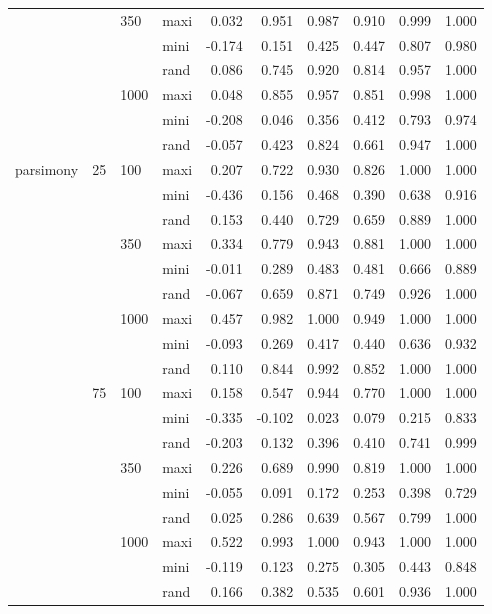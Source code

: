 \begin{longtable}{llllrrrrrr}
   &  & 350 & maxi & 0.032 & 0.951 & 0.987 & 0.910 & 0.999 & 1.000 \\ 
   &  &  & mini & -0.174 & 0.151 & 0.425 & 0.447 & 0.807 & 0.980 \\ 
   &  &  & rand & 0.086 & 0.745 & 0.920 & 0.814 & 0.957 & 1.000 \\ 
   &  & 1000 & maxi & 0.048 & 0.855 & 0.957 & 0.851 & 0.998 & 1.000 \\ 
   &  &  & mini & -0.208 & 0.046 & 0.356 & 0.412 & 0.793 & 0.974 \\ 
   &  &  & rand & -0.057 & 0.423 & 0.824 & 0.661 & 0.947 & 1.000 \\ 
  parsimony & 25 & 100 & maxi & 0.207 & 0.722 & 0.930 & 0.826 & 1.000 & 1.000 \\ 
   &  &  & mini & -0.436 & 0.156 & 0.468 & 0.390 & 0.638 & 0.916 \\ 
   &  &  & rand & 0.153 & 0.440 & 0.729 & 0.659 & 0.889 & 1.000 \\ 
   &  & 350 & maxi & 0.334 & 0.779 & 0.943 & 0.881 & 1.000 & 1.000 \\ 
   &  &  & mini & -0.011 & 0.289 & 0.483 & 0.481 & 0.666 & 0.889 \\ 
   &  &  & rand & -0.067 & 0.659 & 0.871 & 0.749 & 0.926 & 1.000 \\ 
   &  & 1000 & maxi & 0.457 & 0.982 & 1.000 & 0.949 & 1.000 & 1.000 \\ 
   &  &  & mini & -0.093 & 0.269 & 0.417 & 0.440 & 0.636 & 0.932 \\ 
   &  &  & rand & 0.110 & 0.844 & 0.992 & 0.852 & 1.000 & 1.000 \\ 
   & 75 & 100 & maxi & 0.158 & 0.547 & 0.944 & 0.770 & 1.000 & 1.000 \\ 
   &  &  & mini & -0.335 & -0.102 & 0.023 & 0.079 & 0.215 & 0.833 \\ 
   &  &  & rand & -0.203 & 0.132 & 0.396 & 0.410 & 0.741 & 0.999 \\ 
   &  & 350 & maxi & 0.226 & 0.689 & 0.990 & 0.819 & 1.000 & 1.000 \\ 
   &  &  & mini & -0.055 & 0.091 & 0.172 & 0.253 & 0.398 & 0.729 \\ 
   &  &  & rand & 0.025 & 0.286 & 0.639 & 0.567 & 0.799 & 1.000 \\ 
   &  & 1000 & maxi & 0.522 & 0.993 & 1.000 & 0.943 & 1.000 & 1.000 \\ 
   &  &  & mini & -0.119 & 0.123 & 0.275 & 0.305 & 0.443 & 0.848 \\ 
   &  &  & rand & 0.166 & 0.382 & 0.535 & 0.601 & 0.936 & 1.000 \\ 

\end{longtable}
